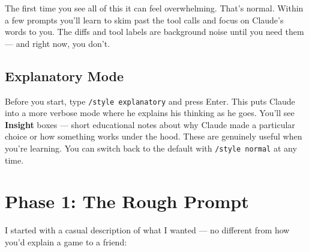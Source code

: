 \documentclass[11pt,a4paper]{article}
\begin{document}
The first time you see all of this it can feel overwhelming. That's normal. Within a few prompts you'll learn to skim past the tool calls and focus on Claude's words to you. The diffs and tool labels are background noise until you need them --- and right now, you don't.

\subsection{Explanatory Mode}

Before you start, type \texttt{/style explanatory} and press Enter. This puts Claude into a more verbose mode where he explains his thinking as he goes. You'll see \textbf{Insight} boxes --- short educational notes about why Claude made a particular choice or how something works under the hood. These are genuinely useful when you're learning. You can switch back to the default with \texttt{/style normal} at any time.

\section{Phase 1: The Rough Prompt}

I started with a casual description of what I wanted --- no different from how you'd explain a game to a friend:
\end{document}
